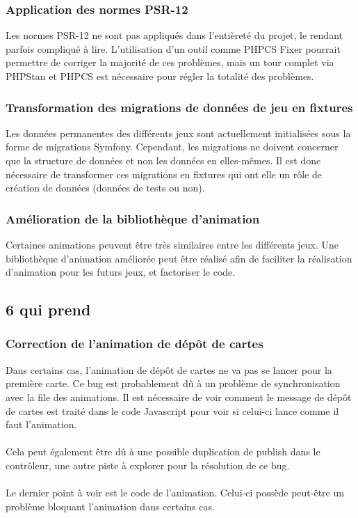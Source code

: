 \documentclass{article}
\begin{document}
            \subsubsection{Application des normes PSR-12}

                Les normes PSR-12 ne sont pas appliqués dans l'entièreté du projet, le rendant parfois compliqué à lire. L'utilisation d'un outil comme PHPCS Fixer pourrait permettre de corriger la majorité de ces problèmes, mais un tour complet via PHPStan et PHPCS est nécessaire pour régler la totalité des problèmes.

            \subsubsection{Transformation des migrations de données de jeu en fixtures}

                Les données permanentes des différents jeux sont actuellement initialisées sous la forme de migrations Symfony. Cependant, les migrations ne doivent concerner que la structure de données et non les données en elles-mêmes. Il est donc nécessaire de transformer ces migrations en fixtures qui ont elle un rôle de création de données (données de tests ou non).

            \subsubsection{Amélioration de la bibliothèque d'animation}

                Certaines animations peuvent être très similaires entre les différents jeux. Une bibliothèque d'animation améliorée peut être réalisé afin de faciliter la réalisation d'animation pour les futurs jeux, et factoriser le code.
            
        \subsection{6 qui prend}
        
            \subsubsection{Correction de l'animation de dépôt de cartes}

                Dans certains cas, l'animation de dépôt de cartes ne va pas se lancer pour la première carte. Ce bug est probablement dû à un problème de synchronisation avec la file des animations. Il est nécessaire de voir comment le message de dépôt de cartes est traité dans le code Javascript pour voir si celui-ci lance comme il faut l'animation.\\
                \\
                \indent Cela peut également être dû à une possible duplication de publish dans le contrôleur, une autre piste à explorer pour la résolution de ce bug.\\
                \\
                \indent Le dernier point à voir est le code de l'animation. Celui-ci possède peut-être un problème bloquant l'animation dans certains cas.
\end{document}
